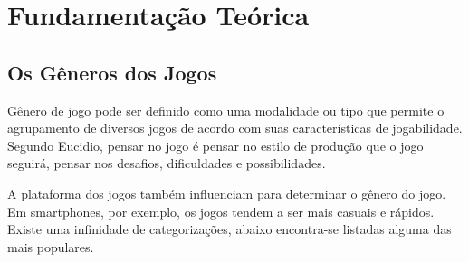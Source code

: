 \chapter{Fundamentação Teórica}
\label{cap:fundamentacao-teorica}


\section{Os Gêneros dos Jogos}
\label{sec:os-generos-dos-jogos}

Gênero de jogo pode ser definido como uma modalidade ou tipo que permite o agrupamento de diversos jogos de acordo com suas características de jogabilidade.
Segundo Eucidio, pensar no jogo é pensar no estilo de produção que o jogo seguirá, pensar nos desafios, dificuldades e possibilidades. \cite{euc}

A plataforma dos jogos também influenciam para determinar o gênero do jogo. Em smartphones, por exemplo, os jogos tendem a ser mais casuais e rápidos. Existe uma infinidade de categorizações, abaixo encontra-se listadas alguma das mais populares. \cite{gen}

